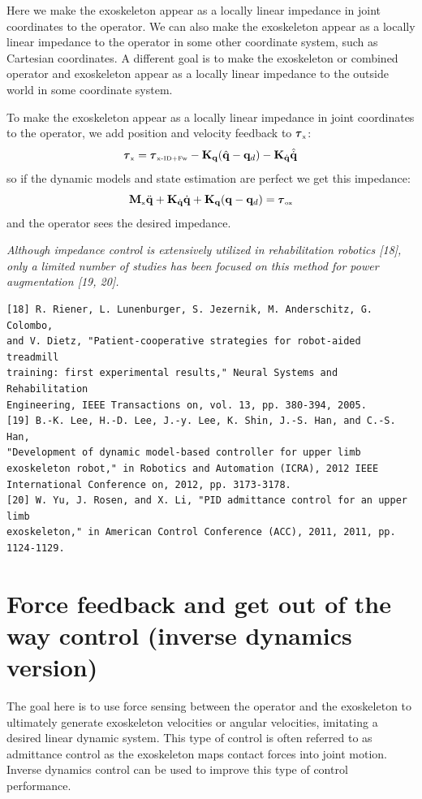 \documentclass[letterpaper,12pt,fullpage]{article}
\newcommand{\myx}{{\mbox {\tiny x}}}
\newcommand{\ox}{{\mbox {\tiny ox}}}
\newcommand{\xinvdynw}{{\mbox {\tiny x-ID+Fw}}}
\begin{document}
Here we make the exoskeleton appear as a locally linear impedance in joint
coordinates to the operator.
We can also make the exoskeleton appear as a locally linear impedance to the
operator in some other coordinate system, such as Cartesian coordinates.
A different goal is to make the exoskeleton or combined operator and
exoskeleton appear as a locally linear impedance to
the outside world in some coordinate system.

To make the exoskeleton appear as a locally linear impedance in joint
coordinates to the operator, we add position and velocity feedback to $\vtau_{\myx}$:
\begin{equation}
\vtau_{\myx} = \vtau_{\xinvdynw} - \mK_{\vq} ( \hat{\vq} - \vq_d ) - \mK_{\dot{\vq}} \hat{\dot{\vq}}
\label{eq:impedance}
\end{equation}
so if the dynamic models and state estimation are perfect we get this impedance:
\begin{equation}
\mM_{\myx} \ddot{\vq} + \mK_{\dot{\vq}} \dot{\vq} + \mK_{\vq} ( \vq - \vq_d ) = \vtau_{\ox}
\end{equation}
and the operator sees the desired impedance.

{\it Although impedance control is extensively utilized in rehabilitation
robotics [18], only a limited number of studies has been focused on
this method for power augmentation [19, 20].}
\begin{verbatim}
[18] R. Riener, L. Lunenburger, S. Jezernik, M. Anderschitz, G. Colombo,
and V. Dietz, "Patient-cooperative strategies for robot-aided treadmill
training: first experimental results," Neural Systems and Rehabilitation
Engineering, IEEE Transactions on, vol. 13, pp. 380-394, 2005.
[19] B.-K. Lee, H.-D. Lee, J.-y. Lee, K. Shin, J.-S. Han, and C.-S. Han,
"Development of dynamic model-based controller for upper limb
exoskeleton robot," in Robotics and Automation (ICRA), 2012 IEEE
International Conference on, 2012, pp. 3173-3178.
[20] W. Yu, J. Rosen, and X. Li, "PID admittance control for an upper limb
exoskeleton," in American Control Conference (ACC), 2011, 2011, pp.
1124-1129.
\end{verbatim}

\section{Force feedback and get out of the way control (inverse dynamics version)}

The goal here is to use force sensing between the operator and the
exoskeleton to ultimately generate exoskeleton velocities or angular velocities,
imitating a desired linear dynamic system.
This type of control is often referred to as admittance control as the
exoskeleton maps contact forces into joint motion.
Inverse dynamics control
can be used to improve this type of control performance.
\end{document}

